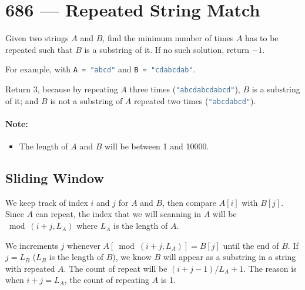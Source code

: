 \section{686 --- Repeated String Match}
Given two strings $A$ and $B$, find the minimum number of times $A$ has to be repeated such that $B$ is a substring of it. If no such solution, return $-1$.

For example, with \lstinline[language=C++, basicstyle=\small\ttfamily, keywordstyle=\bfseries\color{green!40!black}]|A = "abcd"| and \lstinline[language=C++, basicstyle=\small\ttfamily, keywordstyle=\bfseries\color{green!40!black}]|B = "cdabcdab"|.

Return 3, because by repeating $A$ three times (\lstinline[language=C++, basicstyle=\small\ttfamily, keywordstyle=\bfseries\color{green!40!black}]|"abcdabcdabcd"|), $B$ is a substring of it; and $B$ is not a substring of $A$ repeated two times (\lstinline[language=C++, basicstyle=\small\ttfamily, keywordstyle=\bfseries\color{green!40!black}]|"abcdabcd"|).

\paragraph{Note:}

\begin{itemize}
\item The length of $ A $ and $ B $ will be between 1 and 10000.
\end{itemize}

\subsection{Sliding Window}
We keep track of index $i$ and $j$ for $A$ and $B$, then compare $A[i]$ with $B[j]$. Since $A$ can repeat, the index that we will scanning in $A$ will be $\bmod(i+j, L_A)$ where $L_A$ is the length of $A$.

We increments $j$ whenever $A[\bmod(i+j, L_A)]=B[j]$ until the end of $B$. If $j=L_B$ ($L_B$ is the length of $B$), we know $B$ will appear as a substring in a string with repeated $A$. The count of repeat will be $(i+j-1)/L_A+1$. The reason is when $i+j=L_A$, the count of repeating $A$ is 1.

